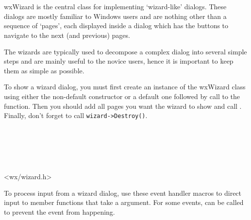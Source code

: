 
\section{}\label{wxwizard}

wxWizard is the central class for implementing `wizard-like' dialogs. These
dialogs are mostly familiar to Windows users and are nothing other than a
sequence of `pages', each displayed inside a dialog which has the
buttons to navigate to the next (and previous) pages.

The wizards are typically used to decompose a complex dialog into several
simple steps and are mainly useful to the novice users, hence it is important
to keep them as simple as possible.

To show a wizard dialog, you must first create an instance of the wxWizard class
using either the non-default constructor or a default one followed by call to the 
 function. Then you should add all pages you
want the wizard to show and call .
Finally, don't forget to call {\tt wizard->Destroy()}.


\\
\\
\\
\\


<wx/wizard.h>


To process input from a wizard dialog, use these event handler macros to
direct input to member functions that take a 
 argument. For some events, 
 can be called to prevent the event from
happening.

\twocolwidtha{7cm}
\begin{twocollist}\itemsep=2pt
\end{twocollist}


